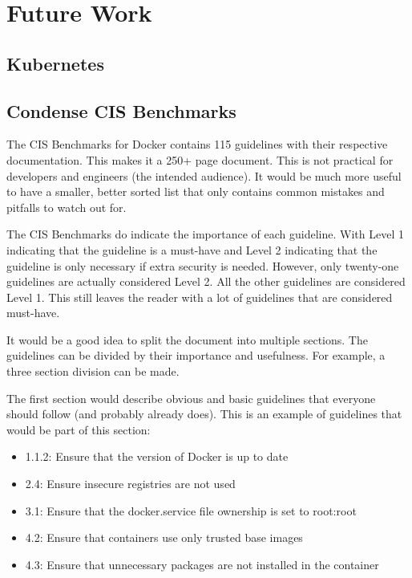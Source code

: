 \chapter{Future Work}
\section{Kubernetes}



\section{Condense CIS Benchmarks}

The CIS Benchmarks for Docker contains 115 guidelines with their respective documentation.
This makes it a 250+ page document. This is not practical for developers and engineers (the intended audience). It would be much more useful to have a smaller, better sorted list that only contains common mistakes and pitfalls to watch out for.

\hfill

The CIS Benchmarks do indicate the importance of each guideline.
With Level 1 indicating that the guideline is a must-have and Level 2 indicating that the guideline is only necessary if extra security is needed. However, only twenty-one guidelines are actually considered Level 2. All the other guidelines are considered Level 1. This still leaves the reader with a lot of guidelines that are considered must-have.

\hfill

It would be a good idea to split the document into multiple sections. The guidelines can be divided by their importance and usefulness. For example, a three section division can be made.

\hfill

The first section would describe obvious and basic guidelines that everyone should follow (and probably already does). This is an example of guidelines that would be part of this section:
\begin{itemize}
    \item 1.1.2: Ensure that the version of Docker is up to date
    \item 2.4: Ensure insecure registries are not used
    \item 3.1: Ensure that the docker.service file ownership is set to root:root
    \item 4.2: Ensure that containers use only trusted base images
    \item 4.3: Ensure that unnecessary packages are not installed in the container
\end{itemize}

